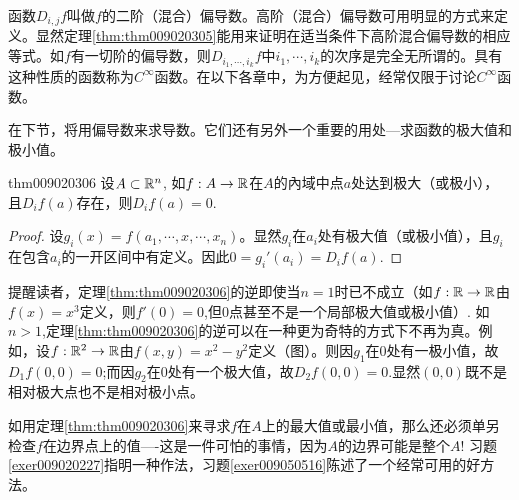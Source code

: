 函数$D_{i,j}f$叫做$f$的二阶（混合）偏导数。高阶（混合）偏导数可用明显的方式来定义。显然定理\ref{thm:thm009020305}能用来证明在适当条件下高阶混合偏导数的相应等式。如$f$有一切阶的偏导数，则$D_{i_1,\cdots, i_k}f$中$i_1,\cdots, i_k$的次序是完全无所谓的。具有这种性质的函数称为$C^{\infty}$函数。在以下各章中，为方便起见，经常仅限于讨论$C^{\infty}$函数。

在下节，将用偏导数来求导数。它们还有另外一个重要的用处---求函数的极大值和极小值。

\begin{theorem}{}{thm009020306}
设$A \subset \mathbb{R}^n$, 如$f:A \to \mathbb{R}$在$A$的內域中点$a$处达到极大（或极小），且$D_if(a)$存在，则$D_if(a) = 0$.
\end{theorem}

\begin{proof}
设$g_i(x) = f(a_1,\cdots,x,\cdots,x_n)$。显然$g_i$在$a_i$处有极大值（或极小值），且$g_i$在包含$a_i$的一开区间中有定义。因此$0 = g_i'(a_i) = D_if(a)$.
\end{proof}

提醒读者，定理\ref{thm:thm009020306}的逆即使当$n=1$时已不成立（如$f:\mathbb{R} \to \mathbb{R}$由$f(x) = x^3$定义，则$f'(0)=0$,但$0$点甚至不是一个局部极大值或极小值）. 如$n > 1$,定理\ref{thm:thm009020306}的逆可以在一种更为奇特的方式下不再为真。例如，设$f:\mathbb{R}^2 \to \mathbb{R}$由$f(x, y) = x^2 - y^2$定义（图）。则因$g_1$在$0$处有一极小值，故$D_1f(0,0)=0$;而因$g_2$在$0$处有一个极大值，故$D_2f(0, 0) = 0$.显然$(0,0)$既不是相对极大点也不是相对极小点。

如用定理\ref{thm:thm009020306}来寻求$f$在$A$上的最大值或最小值，那么还必须单另检查$f$在边界点上的值----这是一件可怕的事情，因为$A$的边界可能是整个$A$! 习题\ref{exer009020227}指明一种作法，习题\ref{exer009050516}陈述了一个经常可用的好方法。


